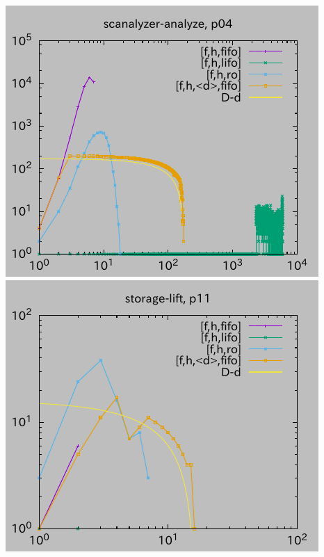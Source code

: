 \includegraphics{img/depth/scanalyzer-analyze/p04.pdf}
\includegraphics{img/depth/storage-lift/p11.pdf}
